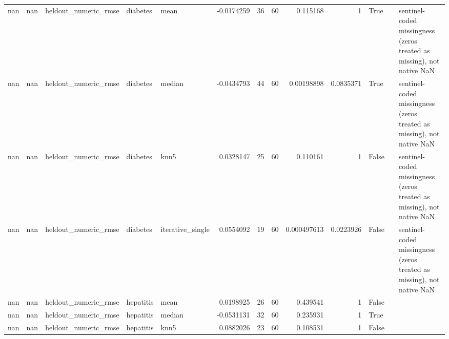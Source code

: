 \begin{table}[ht]
{\begin{tabular}{rrlllrrrrrlll}
        nan &     nan & heldout\_numeric\_rmse           & diabetes       & mean             &     -0.0174259   &                  36 &      60 & 0.115168    & 1           & True               &                                                                                                                    & sentinel-coded missingness (zeros treated as missing), not native NaN \\
        nan &     nan & heldout\_numeric\_rmse           & diabetes       & median           &     -0.0434793   &                  44 &      60 & 0.00198898  & 0.0835371   & True               &                                                                                                                    & sentinel-coded missingness (zeros treated as missing), not native NaN \\
        nan &     nan & heldout\_numeric\_rmse           & diabetes       & knn5             &      0.0328147   &                  25 &      60 & 0.110161    & 1           & False              &                                                                                                                    & sentinel-coded missingness (zeros treated as missing), not native NaN \\
        nan &     nan & heldout\_numeric\_rmse           & diabetes       & iterative\_single &      0.0554092   &                  19 &      60 & 0.000497613 & 0.0223926   & False              &                                                                                                                    & sentinel-coded missingness (zeros treated as missing), not native NaN \\
        nan &     nan & heldout\_numeric\_rmse           & hepatitis      & mean             &      0.0198925   &                  26 &      60 & 0.439541    & 1           & False              &                                                                                                                    &                                                                       \\
        nan &     nan & heldout\_numeric\_rmse           & hepatitis      & median           &     -0.0531131   &                  32 &      60 & 0.235931    & 1           & True               &                                                                                                                    &                                                                       \\
        nan &     nan & heldout\_numeric\_rmse           & hepatitis      & knn5             &      0.0882026   &                  23 &      60 & 0.108531    & 1           & False              &                                                                                                                    &                                                                       \\

\end{tabular}}
\end{table}
